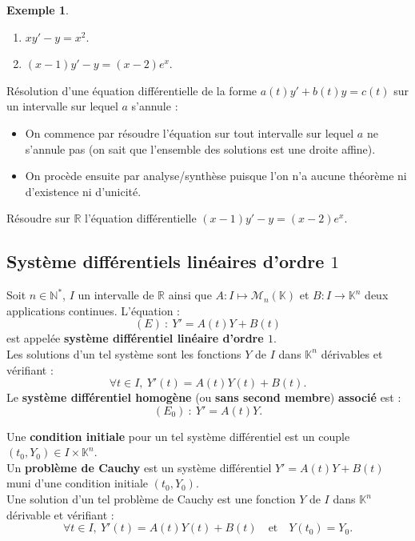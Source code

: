 \documentclass[french]{article}
\newcommand{\N}{\mathbb{N}}
\newcommand{\R}{\mathbb{R}}
\newcommand{\K}{\mathbb{K}}
\newcommand{\st}{^*}
\theoremstyle{plain}
\theoremstyle{definition}
\newtheorem*{ex}{Exemple}
\theoremstyle{remark}
\begin{document}
\begin{ex}
	\begin{enumerate}
		\item $xy'-y=x^2$. %
		\item $(x-1)y'-y=(x-2)e^x$. %
	\end{enumerate}
\end{ex}

\begin{met}
	Résolution d'une équation différentielle de la forme $a(t)y'+b(t)y=c(t)$ sur un intervalle sur lequel $a$ s'annule :
	\begin{itemize}
		\item On commence par résoudre l'équation sur tout intervalle sur lequel $a$ ne s'annule pas (on sait que l'ensemble des solutions est une droite affine).
		\item On procède ensuite par analyse/synthèse puisque l'on n'a aucune théorème ni d'existence ni d'unicité.
	\end{itemize}
\end{met}

\begin{exo}
	Résoudre sur $\R$ l'équation différentielle $(x-1)y'-y=(x-2)e^x$.
\end{exo}

\subsection{Système différentiels linéaires d'ordre $1$}

\begin{dfn}
	Soit $n\in\N\st$, $I$ un intervalle de $\R$ ainsi que $A:I\mapsto\mathcal{M}_n(\K)$ et $B:I\to\K^n$ deux applications continues. L'équation :
	$$(E)\ :\ Y'=A(t)Y+B(t)$$ est appelée \textbf{système différentiel linéaire d'ordre $1$}. \\
	Les solutions d'un tel système sont les fonctions $Y$ de $I$ dans $\K^n$ dérivables et vérifiant :
	$$\forall t\in I,\ Y'(t)=A(t)Y(t)+B(t).$$
	Le \textbf{système différentiel homogène} (ou \textbf{sans second membre}) \textbf{associé} est :
	$$(E_0)\ :\ Y'=A(t)Y.$$
\end{dfn}

\begin{dfn}
	Une \textbf{condition initiale} pour un tel système différentiel est un couple $(t_0,Y_0)\in I\times\K^n$.\\
	Un \textbf{problème de Cauchy} est un système différentiel $Y'=A(t)Y+B(t)$ muni d'une condition initiale $(t_0,Y_0)$.\\
	Une solution d'un tel problème de Cauchy est une fonction $Y$ de $I$ dans $\K^n$ dérivable et vérifiant :
	$$\forall t\in I,\ Y'(t)=A(t)Y(t)+B(t)\quad\text{et}\quad Y(t_0)=Y_0.$$
\end{dfn}
\end{document}
